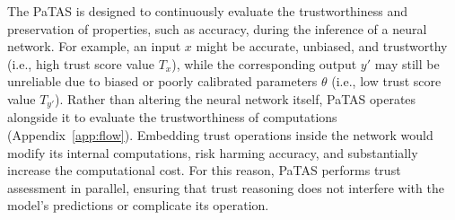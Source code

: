 The PaTAS is designed to continuously evaluate the trustworthiness and preservation of properties, such as accuracy, during the inference of a neural network. For example, an input \(x\) might be accurate, unbiased, and trustworthy (i.e., high trust score value \(T_x\)), while the corresponding output \(y\prime\) may still be unreliable due to biased or poorly calibrated parameters \(\theta\) (i.e., low trust score value \(T_{y\prime}\)). Rather than altering the neural network itself, PaTAS operates alongside it to evaluate the trustworthiness of computations (Appendix~\ref{app:flow}). Embedding trust operations inside the network would modify its internal computations, risk harming accuracy, and substantially increase the computational cost. For this reason, PaTAS performs trust assessment in parallel, ensuring that trust reasoning does not interfere with the model’s predictions or complicate its operation.